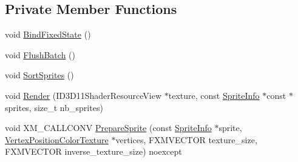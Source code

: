 \subsection*{Private Member Functions}
\begin{DoxyCompactItemize}
\item 
void \hyperlink{classmage_1_1_sprite_batch_aaf4062713fa20c12a3ec5232ebe9bff3}{Bind\+Fixed\+State} ()
\item 
void \hyperlink{classmage_1_1_sprite_batch_a352714b5d02590245ab8ffe8489305f7}{Flush\+Batch} ()
\item 
void \hyperlink{classmage_1_1_sprite_batch_af7a5d406b02cd477c9b80eae9984aa86}{Sort\+Sprites} ()
\item 
void \hyperlink{classmage_1_1_sprite_batch_a847428f3e80c2fe9067ecd96875a8cb0}{Render} (I\+D3\+D11\+Shader\+Resource\+View $\ast$texture, const \hyperlink{structmage_1_1_sprite_info}{Sprite\+Info} $\ast$const $\ast$sprites, size\+\_\+t nb\+\_\+sprites)
\item 
void X\+M\+\_\+\+C\+A\+L\+L\+C\+O\+NV \hyperlink{classmage_1_1_sprite_batch_ade27cb47058823566f360356c1e245ec}{Prepare\+Sprite} (const \hyperlink{structmage_1_1_sprite_info}{Sprite\+Info} $\ast$sprite, \hyperlink{structmage_1_1_vertex_position_color_texture}{Vertex\+Position\+Color\+Texture} $\ast$vertices, F\+X\+M\+V\+E\+C\+T\+OR texture\+\_\+size, F\+X\+M\+V\+E\+C\+T\+OR inverse\+\_\+texture\+\_\+size) noexcept
\end{DoxyCompactItemize}
